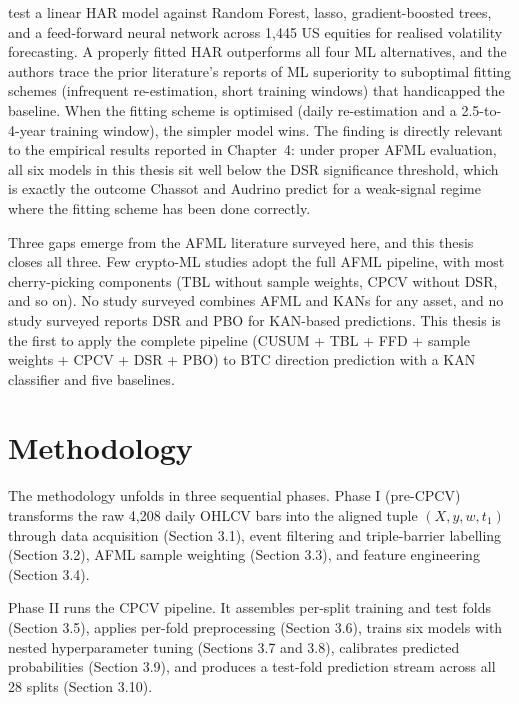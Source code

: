 \documentclass[12pt,a4paper,oneside]{article}
\begin{document}
\citet{chassot_audrino_2026} test a linear HAR model \citep{corsi_2009} against Random Forest, lasso, gradient-boosted trees, and a feed-forward neural network across 1,445 US equities for realised volatility forecasting. A properly fitted HAR outperforms all four ML alternatives, and the authors trace the prior literature's reports of ML superiority to suboptimal fitting schemes (infrequent re-estimation, short training windows) that handicapped the baseline. When the fitting scheme is optimised (daily re-estimation and a 2.5-to-4-year training window), the simpler model wins. The finding is directly relevant to the empirical results reported in Chapter~4: under proper AFML evaluation, all six models in this thesis sit well below the DSR significance threshold, which is exactly the outcome Chassot and Audrino predict for a weak-signal regime where the fitting scheme has been done correctly.

Three gaps emerge from the AFML literature surveyed here, and this thesis closes all three. Few crypto-ML studies adopt the full AFML pipeline, with most cherry-picking components (TBL without sample weights, CPCV without DSR, and so on). No study surveyed combines AFML and KANs for any asset, and no study surveyed reports DSR and PBO for KAN-based predictions. This thesis is the first to apply the complete pipeline (CUSUM + TBL + FFD + sample weights + CPCV + DSR + PBO) to BTC direction prediction with a KAN classifier and five baselines.


\newpage
\section{Methodology}\label{sec:methodology}

The methodology unfolds in three sequential phases. Phase I (pre-CPCV) transforms the raw 4,208 daily OHLCV bars into the aligned tuple $(X, y, w, t_1)$ through data acquisition (Section 3.1), event filtering and triple-barrier labelling (Section 3.2), AFML sample weighting (Section 3.3), and feature engineering (Section 3.4).

Phase II runs the CPCV pipeline. It assembles per-split training and test folds (Section 3.5), applies per-fold preprocessing (Section 3.6), trains six models with nested hyperparameter tuning (Sections 3.7 and 3.8), calibrates predicted probabilities (Section 3.9), and produces a test-fold prediction stream across all 28 splits (Section 3.10).
\end{document}
